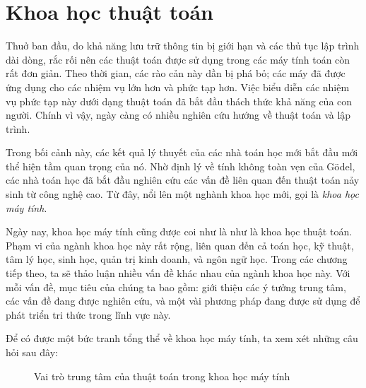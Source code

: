 \section{Khoa học thuật toán}
Thuở ban đầu, do khả năng lưu trữ thông tin bị giới hạn và các thủ tục lập trình dài dòng,
rắc rối nên các thuật toán được sử dụng trong các máy tính toán còn rất đơn giản. Theo
thời gian, các rào cản này dần bị phá bỏ; các máy đã được ứng dụng cho các nhiệm vụ lớn
hơn và phức tạp hơn. Việc biểu diễn các nhiệm vụ phức tạp này dưới dạng thuật toán đã bắt
đầu thách thức khả năng của con người. Chính vì vậy, ngày càng có nhiều nghiên cứu hướng
về thuật toán và lập trình.

Trong bối cảnh này, các kết quả lý thuyết của các nhà toán học mới bắt
đầu mới thể hiện tầm quan trọng của nó. Nhờ định lý về tính không toàn
vẹn của G\"odel, các nhà toán học đã bắt đầu nghiên cứu các vấn đề
liên quan đến thuật toán nảy sinh từ công nghệ cao. Từ đây, nổi lên
một nghành khoa học mới, gọi là \textit{khoa học máy tính}.

Ngày nay, khoa học máy tính cũng được coi như là như là khoa học thuật
toán. Phạm vi của ngành khoa học này rất rộng, liên quan đến cả toán
học, kỹ thuật, tâm lý học, sinh học, quản trị kinh doanh, và ngôn ngữ
học. Trong các chương tiếp theo, ta sẽ thảo luận nhiều vấn đề
khác nhau của ngành khoa học này. Với mỗi vấn đề, mục tiêu của chúng
ta bao gồm: giới thiệu các ý tưởng trung tâm, các vấn đề đang được
nghiên cứu, và một vài phương pháp đang được sử dụng để phát triển tri
thức trong lĩnh vực này.

Để có được một bức tranh tổng thể về khoa học máy tính, ta xem
xét những câu hỏi sau đây:

\begin{figure}[tb] 
\centering
\caption{Vai trò trung tâm của thuật toán trong khoa học máy tính}
  \label{fig:fig0.5}
\end{figure}

